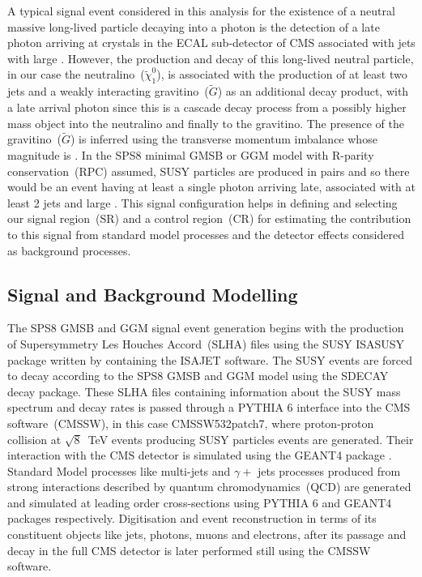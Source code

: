 A typical signal event considered in this analysis for the existence of a neutral massive long-lived particle decaying into a photon is the detection of a late photon arriving at crystals in the ECAL sub-detector of CMS associated with jets with large \MET .  However, the production and decay of this long-lived neutral particle, in our case the neutralino~($\tilde{\chi}^{0}_{1}$), is associated with the production of at least two jets and a weakly interacting gravitino~($\tilde{G}$) as an additional decay product, with a late arrival photon since this is a cascade decay process from a possibly higher mass object into the neutralino and finally to the gravitino. The presence of the gravitino~($\tilde{G}$) is inferred using the transverse momentum imbalance whose magnitude is \MET .
In the  SPS8 minimal GMSB or GGM model with R-parity conservation~(RPC) assumed, SUSY particles are  produced in pairs and so there would be an event having at least a single photon arriving late, associated with at least 2 jets and large \MET . This signal configuration helps in defining and selecting our signal region~(SR) and a control region~(CR) for estimating the contribution to this signal from standard model processes and the detector effects considered as background processes.
\subsection{Signal and Background Modelling}
The SPS8 GMSB and GGM signal event generation begins with the production of Supersymmetry Les Houches Accord~(SLHA) files using the SUSY ISASUSY package written by \cite{Baer}  containing the ISAJET software. The SUSY events are forced to decay according to the SPS8 GMSB and GGM model using the SDECAY decay package. These SLHA files containing information about the SUSY mass spectrum and decay rates is passed through a PYTHIA 6 \cite{pythia6} interface into the CMS software~(CMSSW), in this case CMSSW532patch7, where proton-proton collision at $\sqrt{8}$~TeV events producing SUSY particles events are generated. Their interaction with the CMS detector is simulated using the GEANT4 package \cite{geant4}. Standard Model processes like  multi-jets and $\gamma +$ jets processes produced from strong interactions described by quantum chromodynamics~(QCD) are generated and simulated at leading order cross-sections using PYTHIA 6 and GEANT4 packages respectively.
Digitisation and event reconstruction in terms of its constituent objects like jets, photons, muons and electrons, after its passage and decay in the full CMS detector is later performed still using the CMSSW software.
